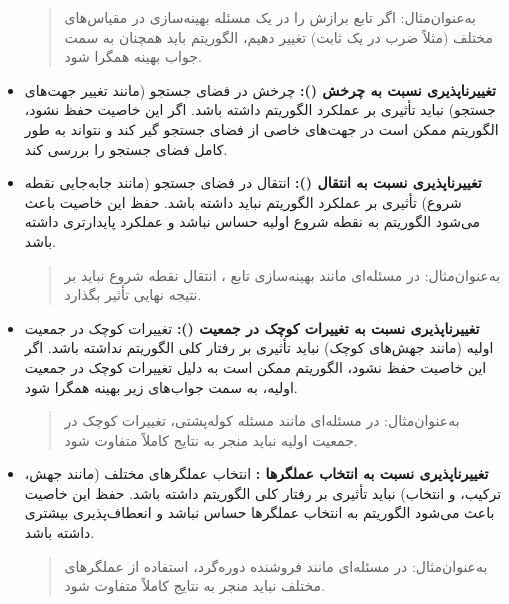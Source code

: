 \documentclass[12pt]{exam}
\begin{document}
\begin{questions}
\begin{itemize}
	 	\begin{quote}
	 	به‌عنوان‌مثال: 
	 	اگر تابع برازش را در یک مسئله بهینه‌سازی در مقیاس‌های مختلف (مثلاً ضرب در یک ثابت) تغییر دهیم، الگوریتم باید همچنان به سمت جواب بهینه همگرا شود.
	 	\end{quote}
	 	
	 	\item \textbf{تغییرناپذیری نسبت به چرخش ():}
	 	چرخش در فضای جستجو (مانند تغییر جهت‌های جستجو) نباید تأثیری بر عملکرد الگوریتم داشته باشد. اگر این خاصیت حفظ نشود، الگوریتم ممکن است در جهت‌های خاصی از فضای جستجو گیر کند و نتواند به طور کامل فضای جستجو را بررسی کند.
	 	
	 	\item \textbf{ تغییرناپذیری نسبت به انتقال ():}
	 	انتقال در فضای جستجو (مانند جابه‌جایی نقطه شروع) تأثیری بر عملکرد الگوریتم نباید داشته باشد. حفظ این خاصیت باعث می‌شود الگوریتم به نقطه شروع اولیه حساس نباشد و عملکرد پایدارتری داشته باشد.
	 	
	 	\begin{quote}
	 	به‌عنوان‌مثال: 
در مسئله‌ای مانند بهینه‌سازی تابع
، انتقال نقطه شروع نباید بر نتیجه نهایی تأثیر بگذارد.
	 	\end{quote}

	 	
	 	\item \textbf{تغییرناپذیری نسبت به تغییرات کوچک در جمعیت ():}
	 	تغییرات کوچک در جمعیت اولیه (مانند جهش‌های کوچک) نباید تأثیری بر رفتار کلی الگوریتم نداشته باشد. اگر این خاصیت حفظ نشود، الگوریتم ممکن است به دلیل تغییرات کوچک در جمعیت اولیه، به سمت جواب‌های زیر بهینه همگرا شود.
	 	
	 	\begin{quote}
به‌عنوان‌مثال: 
در مسئله‌ای مانند مسئله کوله‌پشتی، تغییرات کوچک در جمعیت اولیه نباید منجر به نتایج کاملاً متفاوت شود.
	 	\end{quote}
	 	
	 	
	 	\item \textbf{تغییرناپذیری نسبت به انتخاب عملگرها :}
	 	انتخاب عملگرهای مختلف (مانند جهش، ترکیب، و انتخاب) نباید تأثیری بر رفتار کلی الگوریتم داشته باشد. حفظ این خاصیت باعث می‌شود الگوریتم به انتخاب عملگرها حساس نباشد و انعطاف‌پذیری بیشتری داشته باشد.
	 	\begin{quote}
به‌عنوان‌مثال: 
در مسئله‌ای مانند فروشنده دوره‌گرد، استفاده از عملگرهای مختلف نباید منجر به نتایج کاملاً متفاوت شود.
	 	\end{quote}
	 		 	

\end{itemize}
\end{questions}
\end{document}
